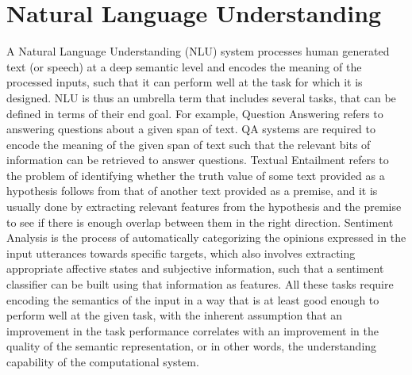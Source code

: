 \section{Natural Language Understanding}
A Natural Language Understanding (NLU) system processes human generated text (or speech) at a deep semantic level and encodes the meaning
of the processed inputs, such that it can perform well at the task for which it is designed. NLU is thus an umbrella term that includes several
tasks, that can be defined in terms of their end goal. For example, Question Answering refers to answering questions about a given span of text.
QA systems are required to encode the meaning of the given span of text such that the relevant bits of information can be retrieved to answer questions.
Textual Entailment refers to the problem of identifying whether the truth value of some text provided as a hypothesis follows from that of another 
text provided as a premise, and it is usually done by extracting relevant features from the hypothesis and the premise to see if there is enough
overlap between them in the right direction. Sentiment Analysis is the process of automatically categorizing the opinions expressed in the input
utterances towards specific targets, which also involves extracting appropriate affective states and subjective information, such that a sentiment classifier
can be built using that information as features. All these tasks require encoding the semantics of the input in a way that is
at least good enough to perform well at the given task, with the inherent assumption that an improvement in the task performance correlates with an improvement in the
quality of the semantic representation, or in other words, the understanding capability of the computational system.

